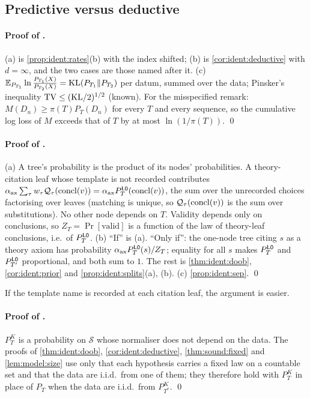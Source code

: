 \subsection{Predictive versus deductive}\label{app:ident:pred}

\paragraph{Proof of .} (a) is \cref{prop:ident:rates}(b) with the index shifted; (b) is \cref{cor:ident:deductive} with $d=\infty$, and the two cases are those named after it. (c) $\mathbb{E}_{P_{T_1}}\ln\frac{P_{T_1}(X)}{P_{T_2}(X)}=\mathrm{KL}(P_{T_1}\|P_{T_2})$ per datum, summed over the data; Pinsker's inequality $\mathrm{TV}\le(\mathrm{KL}/2)^{1/2}$ (known). For the misspecified remark: $M(D_n)\ge\pi(T)P_T(D_n)$ for every $T$ and every sequence, so the cumulative log loss of $M$ exceeds that of $T$ by at most $\ln(1/\pi(T))$. \qed

\paragraph{Proof of .} (a) A tree's probability is the product of its nodes' probabilities. A theory-citation leaf whose template is not recorded contributes $\alpha_{\mathrm{ax}}\sum_\tau w_\tau\mathcal{Q}_\tau(\mathrm{concl}(v))=\alpha_{\mathrm{ax}}P^{\mathord{\mathsf{L0}}}_T(\mathrm{concl}(v))$, the sum over the unrecorded choices factorising over leaves (matching is unique, so $\mathcal{Q}_\tau(\mathrm{concl}(v))$ is the sum over substitutions). No other node depends on $T$. Validity depends only on conclusions, so $Z_T=\Pr[\text{valid}]$ is a function of the law of theory-leaf conclusions, i.e.\ of $P^{\mathord{\mathsf{L0}}}_T$. (b) ``If'' is (a). ``Only if'': the one-node tree citing $s$ as a theory axiom has probability $\alpha_{\mathrm{ax}}P^{\mathord{\mathsf{L0}}}_T(s)/Z_T$; equality for all $s$ makes $P^{\mathord{\mathsf{L0}}}_T$ and $P^{\mathord{\mathsf{L0}}}_{T'}$ proportional, and both sum to $1$. The rest is \cref{thm:ident:doob}, \cref{cor:ident:prior} and \cref{prop:ident:splits}(a), (b). (c) \cref{prop:ident:sep}. \qed

If the template name is recorded at each citation leaf, the argument is easier.

\paragraph{Proof of .} $P^K_T$ is a probability on $\mathcal S$ whose normaliser does not depend on the data. The proofs of \cref{thm:ident:doob}, \cref{cor:ident:deductive}, \cref{thm:sound:fixed} and \cref{lem:model:size} use only that each hypothesis carries a fixed law on a countable set and that the data are i.i.d.\ from one of them; they therefore hold with $P^K_T$ in place of $P_T$ when the data are i.i.d.\ from $P^K_{T^*}$. \qed
